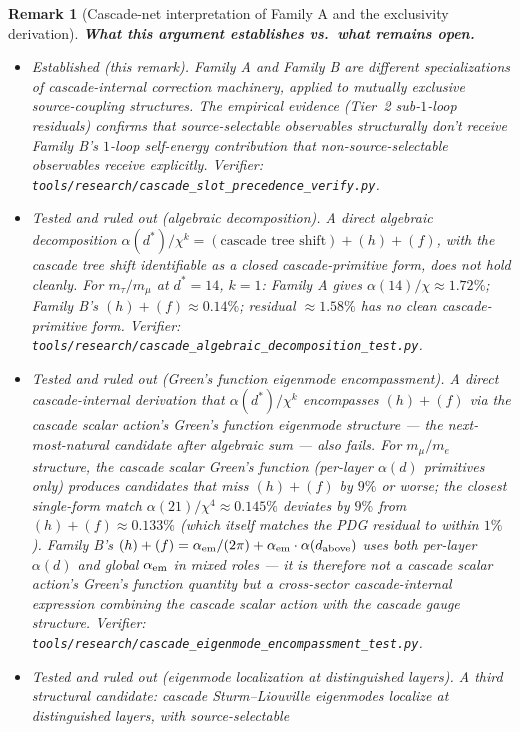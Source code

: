 \documentclass[12pt,a4paper]{article}
\newtheorem*{remark}{Remark}
\begin{document}
\begin{remark}[Cascade-net interpretation of Family A and the exclusivity derivation]
\medskip\noindent\textbf{What this argument establishes vs.\ what
remains open.}
\begin{itemize}[nosep]
\item \emph{Established (this remark).} Family A and Family B are
different specializations of cascade-internal correction machinery,
applied to mutually exclusive source-coupling structures. The
empirical evidence (Tier~2 sub-$1$-loop residuals) confirms that
source-selectable observables structurally don't receive Family B's
$1$-loop self-energy contribution that non-source-selectable
observables receive explicitly. Verifier:
\texttt{tools/research/cascade\_slot\_precedence\_verify.py}.
\item \emph{Tested and ruled out (algebraic decomposition).} A direct
algebraic decomposition $\alpha(d^*)/\chi^k = (\text{cascade tree shift}) +
(h)+(f)$, with the cascade tree shift identifiable as a closed
cascade-primitive form, does \emph{not} hold cleanly. For $m_\tau/m_\mu$
at $d^* = 14$, $k = 1$: Family A gives $\alpha(14)/\chi \approx 1.72\%$;
Family B's $(h)+(f) \approx 0.14\%$; residual $\approx 1.58\%$ has no
clean cascade-primitive form. Verifier:
\texttt{tools/research/cascade\_algebraic\_decomposition\_test.py}.
\item \emph{Tested and ruled out (Green's function eigenmode encompassment).}
A direct cascade-internal derivation that $\alpha(d^*)/\chi^k$
encompasses $(h)+(f)$ via the cascade scalar action's Green's
function eigenmode structure --- the next-most-natural candidate
after algebraic sum --- also fails. For $m_\mu/m_e$ structure, the
cascade scalar Green's function (per-layer $\alpha(d)$ primitives only)
produces candidates that miss $(h)+(f)$ by $9\%$ or worse; the closest
single-form match $\alpha(21)/\chi^4 \approx 0.145\%$ deviates by $9\%$
from $(h)+(f) \approx 0.133\%$ (which itself matches the PDG residual
to within $1\%$). Family B's $(h)+(f) =
\alpha_{\rm em}/(2\pi) + \alpha_{\rm em}\cdot\alpha(d_{\rm above})$
uses both per-layer $\alpha(d)$ \emph{and} global $\alpha_{\rm em}$
in mixed roles --- it is therefore not a cascade scalar action's
Green's function quantity but a cross-sector cascade-internal
expression combining the cascade scalar action with the cascade gauge
structure. Verifier:
\texttt{tools/research/cascade\_eigenmode\_encompassment\_test.py}.
\item \emph{Tested and ruled out (eigenmode localization at distinguished
layers).} A third structural candidate: cascade Sturm--Liouville
eigenmodes localize at distinguished layers, with source-selectable

\end{itemize}
\end{remark}
\end{document}
